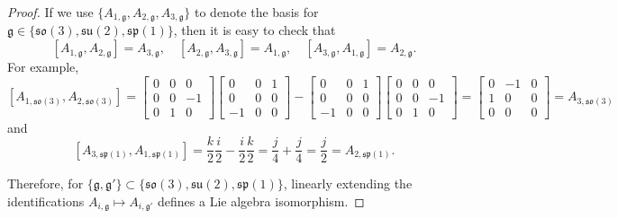 \begin{proof}
	If we use $\{A_{1,\mathfrak{g}},A_{2,\mathfrak{g}},A_{3,\mathfrak{g}}\}$ to denote the basis for $\mathfrak{g} \in \{ \mathfrak{so}(3), \mathfrak{su}(2),\mathfrak{sp}(1)\}$, then it is easy to check that
	\[
		[A_{1,\mathfrak{g}}, A_{2, \mathfrak{g}}] = A_{3, \mathfrak{g}}, \quad [A_{2,\mathfrak{g}}, A_{3, \mathfrak{g}}] = A_{1, \mathfrak{g}}, \quad [A_{3,\mathfrak{g}}, A_{1, \mathfrak{g}}] = A_{2, \mathfrak{g}}.
	\]
	For example,
	\[
		[A_{1,\mathfrak{so}(3)}, A_{2, \mathfrak{so}(3)}] = \begin{bmatrix} 0 & 0 & 0 \\ 0 & 0 & -1\\ 0 & 1 & 0 \end{bmatrix} \begin{bmatrix} 0 & 0 & 1 \\ 0 & 0 & 0\\ -1 & 0 & 0 \end{bmatrix} -  \begin{bmatrix} 0 & 0 & 1 \\ 0 & 0 & 0\\ -1 & 0 & 0 \end{bmatrix} \begin{bmatrix} 0 & 0 & 0 \\ 0 & 0 & -1\\ 0 & 1 & 0 \end{bmatrix} =  \begin{bmatrix} 0 & -1 & 0 \\ 1 & 0 & 0\\ 0 & 0 & 0 \end{bmatrix} = A_{3, \mathfrak{so}(3)}
	\]
	and
	\[
		[A_{3,\mathfrak{sp}(1)}, A_{1, \mathfrak{sp}(1)}] = \frac{k}{2} \frac{i}{2} - \frac{i}{2} \frac{k}{2} = \frac{j}{4} + \frac{j}{4} =  \frac{j}{2} = A_{2, \mathfrak{sp}(1)}.
	\]
	
	Therefore, for $\{\mathfrak{g}, \mathfrak{g}'\} \subset \{\mathfrak{so}(3), \mathfrak{su}(2),\mathfrak{sp}(1)\}$, linearly extending the identifications $A_{i,\mathfrak{g}} \mapsto A_{i,\mathfrak{g}'}$ defines a Lie algebra isomorphism.
\end{proof}
